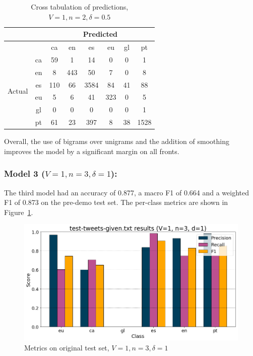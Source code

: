 \documentclass[runningheads]{llncs}
\begin{document}
\begin{table}
	\centering
	\caption{Cross tabulation of predictions, $V=1, n=2, \delta=0.5$}
	\label{tab:pre_demo_confusion_1_2_0.5}
	\begin{tabular}{|c|c|c|c|c|c|c|c|} \hline
		& & \multicolumn{6}{c|}{Predicted} \\ \hline
		& &   ca &   en &    es &   eu &  gl &    pt \\ \hline
		\multirow{6}{*}{Actual} & ca   &   59 &    1 &    14 &    0 &   0 &     1 \\
		& en   &    8 &  443 &    50 &    7 &   0 &     8 \\
		& es   &  110 &   66 &  3584 &   84 &  41 &    88 \\
		& eu   &    5 &    6 &    41 &  323 &   0 &     5 \\
		& gl   &    0 &    0 &     0 &    0 &   0 &     1 \\
		& pt   &   61 &   23 &   397 &    8 &  38 &  1528 \\ \hline
	\end{tabular}
\end{table}

Overall, the use of bigrams over unigrams and the addition of smoothing improves the model by a significant margin on all fronts.

\subsubsection{Model 3 ($V=1, n=3, \delta=1$): }
The third model had an accuracy of 0.877, a macro F1 of 0.664 and a weighted F1 of 0.873 on the pre-demo test set. The per-class metrics are shown in Figure~\ref{fig:pre_demo_1_3_1}. \\

\begin{figure}
    \begin{center}
        \includegraphics[width=12.5cm]{images/test_tweets_given_results_1_3_1.png}
        \caption{Metrics on original test set, $V=1, n=3, \delta=1$}
        \label{fig:pre_demo_1_3_1}
    \end{center}
\end{figure}
\end{document}
